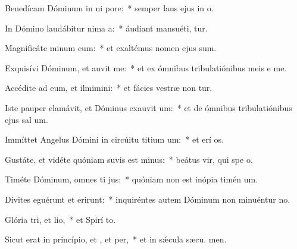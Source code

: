 \item Benedícam Dóminum in ni pore:~* semper laus ejus in  o.
\item In Dómino laudábitur nima a:~* áudiant mansuéti,  tur.
\item Magnificáte minum cum:~* et exaltémus nomen ejus  sum.
\item Exquisívi Dóminum, et auvit me:~* et ex ómnibus tribulatiónibus meis e me.
\item Accédite ad eum, et ilmimini:~* et fácies vestræ non tur.
\item Iste pauper clamávit, et Dóminus exauvit um:~* et de ómnibus tribulatiónibus ejus sal um.
\item Immíttet Angelus Dómini in circúitu titium um:~* et erí os.
\item Gustáte, et vidéte quóniam suvis est minus:~* beátus vir, qui spe  o.
\item Timéte Dóminum, omnes ti jus:~* quóniam non est inópia timén um.
\item Dívites eguérunt et erirunt:~* inquiréntes autem Dóminum non minuéntur  no.
\item Glória tri, et lio,~* et Spirí to.
\item Sicut erat in princípio, et , et per,~* et in sǽcula sæcu. men.
